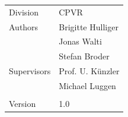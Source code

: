 \begin{titlepage}
\begin{flushleft}
\begin{tabular}{p{5cm}p{8cm}}
\Large{Division} & \Large{CPVR}\\[0.2cm]
\Large{Authors} & \Large{Brigitte Hulliger}\\[0.2cm]
& \Large{Jonas Walti}\\[0.2cm]
& \Large{Stefan Broder}\\[0.2cm]
\Large{Supervisors} & \Large{Prof. U. K\"unzler} \\[0.2cm]
& \Large{Michael Luggen }\\[0.2cm]
& \\
\Large{Version} & \Large{1.0} \\
\end{tabular} 

 \end{flushleft}
\end{titlepage}
